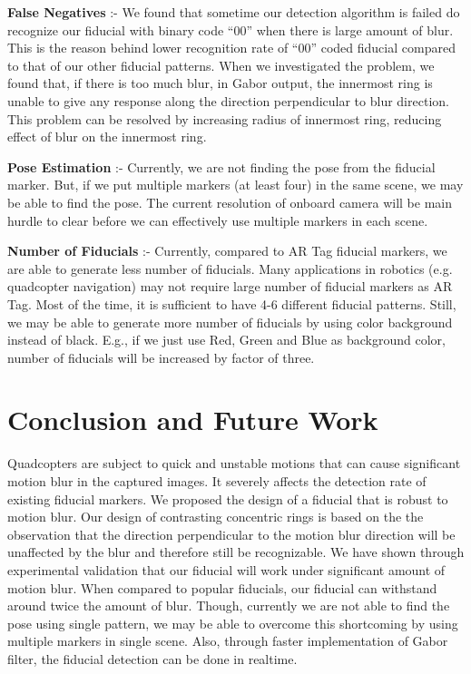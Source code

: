 \documentclass[runningheads]{llncs}
\begin{document}
\textbf{False Negatives} :- We found that sometime our detection algorithm is
failed do recognize our fiducial with binary code ``00'' when there is large
amount of blur. This is the reason behind lower recognition rate of ``00''
coded fiducial compared to that of our other fiducial patterns. When we
investigated the problem, we found that, if there is too much blur, in Gabor
output, the innermost ring is unable to give any response along the direction
perpendicular to blur direction. This problem can be resolved by increasing
radius of innermost ring, reducing effect of blur on the innermost ring.

\textbf{Pose Estimation} :- Currently, we are not finding the pose from the
fiducial marker. But, if we put multiple markers (at least four) in the same
scene, we may be able to find the pose. The current resolution of onboard camera
will be main hurdle to clear before we can effectively use multiple markers in
each scene.

\textbf{Number of Fiducials} :- Currently, compared to AR Tag fiducial markers,
we are able to generate less number of fiducials. Many applications in
robotics (e.g. quadcopter navigation) may not require large number of fiducial
markers as AR Tag. Most of the time, it is sufficient to have 4-6
different fiducial patterns. Still, we may be able to generate more number of
fiducials by using color background instead of black. E.g., if we just use Red,
Green and Blue as background color, number of fiducials will be increased by
factor of three.

\section{Conclusion and Future Work}
Quadcopters are subject to quick and unstable motions that can cause significant
motion blur in the captured images. It severely affects the detection rate of
existing fiducial markers. We proposed the design of a fiducial that is robust
to motion blur. Our design of contrasting concentric rings is based on the the
observation that the direction perpendicular to the motion blur direction will
be unaffected by the blur and therefore still be recognizable. We have shown
through experimental validation that our fiducial will work under significant
amount of motion blur. When compared to popular fiducials, our fiducial can
withstand around twice the amount of blur.  Though, currently we are not able to
find the pose using single pattern, we may be able to overcome this
shortcoming by using multiple markers in single scene. Also, through faster
implementation of Gabor filter, the fiducial detection can be done in realtime.



\end{document}
